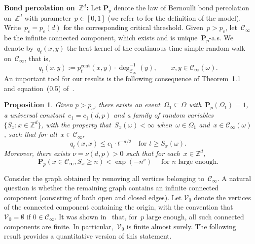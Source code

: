 \documentclass[a4paper,11pt]{article}
\newcommand{\ZZ}{\mathbb{Z}}
\newtheorem{proposition}{Proposition}
\newtheorem{remark}{Remark}
\theoremstyle{definition}
\begin{document}
\noindent \textbf{Bond percolation on~$\ZZ^d$:} Let $\mathbf{P}_p$ denote the law of Bernoulli bond percolation on~$\mathbb{Z}^d$ with
parameter~$p\in[0,1]$ (we refer to \cite{grimmett1999percolation} for the definition of the model). Write~$p_c=p_c(d)$ for the corresponding critical threshold. Given~$p>p_c$, let~$\mathcal{C}_\infty$ be the infinite connected component, which exists and is unique~$\mathbf{P}_p$-a.s.  We denote by~$q_t(x,y)$ the heat kernel of the continuous time simple random walk on~$\mathcal{C}_\infty$, that is,
\begin{equation}\label{eq_q_t_heat_kernel_def}
q_t(x,y):= p^\mathrm{cont}_t(x,y) \cdot \deg_{\mathcal C_\infty}^{-1}(y), \qquad x,y\in \mathcal{C}_\infty(\omega).
\end{equation}
An important tool for our results is the following consequence of Theorem~1.1 and equation~(0.5) of~\cite{barlow2004random}.
\begin{proposition}\label{thm:bounds_HK_percolation}
Given $p>p_c$, there exists an event~$\Omega_1 \subseteq \Omega$ with~$\mathbf P_p(\Omega_1) = 1$, a universal constant~$c_1 = c_1(d,p)$ and a family of random variables~$\{S_x:x\in \mathbb{Z}^d\}$, with the property that~$S_x(\omega) < \infty$ when~$\omega \in \Omega_1$ and~$x \in \mathcal C_\infty(\omega)$, such that for all~$x \in \mathcal C_\infty$,
$$ q_t(x,x) \leq c_1 \cdot t^{-d/2} \quad \text{for } t \ge S_x(\omega). $$
Moreover, there exists $\nu = \nu(d,p)  > 0 $ such that for each~$x \in \ZZ^d$,
$$\mathbf{P}_p(x\in \mathcal{C}_{\infty},S_x\ge n)<\exp(-n^{\nu}) \quad \text{ for } n \text{ large enough.}$$
\end{proposition} 


Consider the graph obtained by removing all vertices belonging to~$\mathcal C_\infty$. A natural question is whether the remaining graph contains an infinite connected component (consisting of both open and closed edges). Let $\mathcal{V}_{0}$ denote the vertices of the connected component containing the origin, with the convention that $\mathcal{V}_0=\emptyset$ if $0\in \mathcal{C}_{\infty}$. It was shown in~\cite[Theorem~4.2]{grimmett2014percolation} that, for~$p$ large enough, all such connected components are finite. In particular,~$\mathcal V_0$ is finite almost surely. The following result provides a quantitative version of this statement. 
\end{document}
